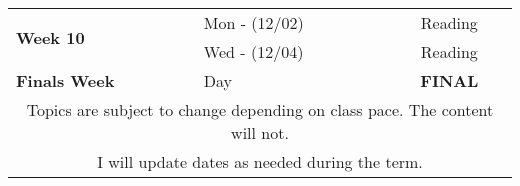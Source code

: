 \begin{table}[ht]
{\begin{tabular}{l@{\hskip 0.25in} l l c}
    \midrule
        \multirow{2}{*}{\textbf{Week 10}} & Mon -  (12/02) & \multicolumn{2}{c}{Reading}\\
        & Wed -  (12/04) & \multicolumn{2}{c}{Reading}\\ 
    \midrule
        \textbf{Finals Week} & Day & \multicolumn{2}{c}{\textbf{FINAL}} \\
    \bottomrule \bottomrule
    \multicolumn{4}{c}{\footnotesize Topics are subject to change depending on class pace. The content will not. } \\
    \multicolumn{4}{c}{\footnotesize I will update dates as needed during the term.}
    \end{tabular}
    }
    \label{tab:schedule}
\end{table}